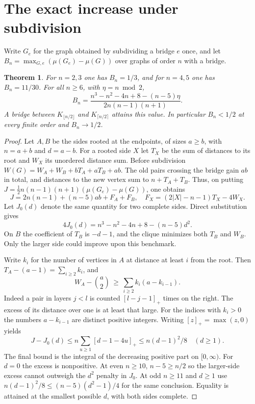 \documentclass[11pt,a4paper]{article}
\newtheorem{theorem}{Theorem}[section]
\begin{document}
\section{The exact increase under subdivision}
Write $G_e$ for the graph obtained by subdividing a bridge $e$ once, and let
$B_n=\max_{G,e}(\mu(G_e)-\mu(G))$ over graphs of order $n$ with a bridge.
\begin{theorem}\label{p09-th:sub}
For $n=2,3$ one has $B_n=1/3$, and for $n=4,5$ one has $B_n=11/30$.
For all $n\ge6$, with $\eta=n\bmod2$,
\[
 B_n=\frac{n^3-n^2-4n+8-(n-5)\eta}{2n(n-1)(n+1)} .
\]
A bridge between $K_{\lfloor n/2\rfloor}$ and $K_{\lceil n/2\rceil}$
attains this value. In particular $B_n<1/2$ at every finite order and
$B_n\longrightarrow1/2$.
\end{theorem}
\begin{proof}
Let $A,B$ be the sides rooted at the endpoints, of sizes $a\ge b$, with
$n=a+b$ and $d=a-b$. For a rooted side $X$ let $T_X$ be the sum of
distances to its root and $W_X$ its unordered distance sum. Before
subdivision $W(G)=W_A+W_B+bT_A+aT_B+ab$. The old pairs crossing the
bridge gain $ab$ in total, and distances to the new vertex sum to
$n+T_A+T_B$. Thus, on putting
$J=\tfrac12n(n-1)(n+1)(\mu(G_e)-\mu(G))$, one obtains
\[
 J=2n(n-1)+(n-5)ab+F_A+F_B,\quad
 F_X=(2|X|-n-1)T_X-4W_X .
\]
Let $J_0(d)$ denote the same quantity for two complete sides. Direct
substitution gives
\[
 4J_0(d)=n^3-n^2-4n+8-(n-5)d^2 .
\]
On $B$ the coefficient of $T_B$ is $-d-1$, and the clique minimizes
both $T_B$ and $W_B$. Only the larger side could improve upon this benchmark.

Write $k_i$ for the number of vertices in $A$ at distance at least $i$
from the root. Then $T_A-(a-1)=\sum_{i\ge2} k_i$, and
\[
 W_A-\binom a2\ \ge\ \sum_{i\ge2} k_i(a-k_{i-1}).
\]
Indeed a pair in layers $j<l$ is counted $[l-j-1]_+$ times on the
right. The excess of its distance over one is at least that large.
For the indices with $k_i>0$ the numbers $a-k_{i-1}$ are distinct
positive integers. Writing $[z]_+=\max(z,0)$ yields
\[
 J-J_0(d)\le n\sum_{u\ge1}[d-1-4u]_+
            \le n(d-1)^2/8\quad(d\ge1).
\]
The final bound is the integral of the decreasing positive part on
$[0,\infty)$. For $d=0$ the excess is nonpositive. At even $n\ge10$,
$n-5\ge n/2$ so the larger-side excess cannot outweigh the $d^2$
penalty in $J_0$. At odd $n\ge11$ and $d\ge1$ use
$n(d-1)^2/8\le(n-5)(d^2-1)/4$ for the same conclusion. Equality
is attained at the smallest possible $d$, with both sides complete.


\end{proof}
\end{document}
